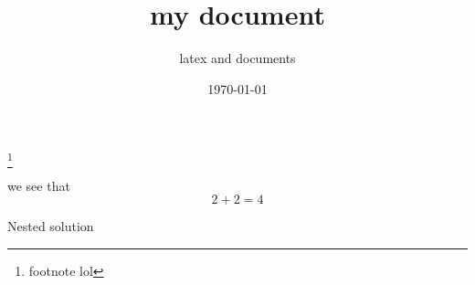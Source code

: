 \documentclass[12pt,en,bordered]{uni-style}
\title{my document}
\subtitle{latex and documents}
\date{\today}
\begin{document}
\maketitlepage
\maketitlestart
\blindtext[2]
\footnote{footnote lol}
\begin{qsolve}[My conclusion]
	we see that $$2+2=4$$
	\begin{qsolve}[]
		Nested solution
	\end{qsolve}
\end{qsolve}
\vfil
\begin{conclusion}
	\blindtext
\end{conclusion}
\clearpage
\blinddocument
\end{document}
